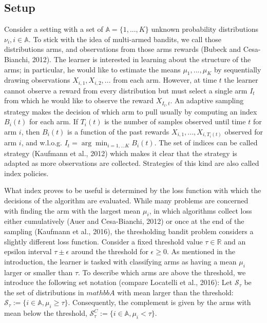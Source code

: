 \documentclass[12pt,]{article}
\begin{document}
\subsection{\texorpdfstring{Setup
\label{sec:Setup}}{Setup }}\label{setup}

Consider a setting with a set of \(\mathbb{A}=\{1, ..., K\}\) unknown
probability distributions \(\nu_i, i \in \mathbb{A}\). To stick with the
idea of multi-armed bandits, we call those distributions arms, and
observations from those arms rewards (Bubeck and Cesa-Bianchi, 2012).
The learner is interested in learning about the structure of the arms;
in particular, he would like to estimate the means \(\mu_1, ..., \mu_K\)
by sequentially drawing observations \(X_{i,1}, X_{i,2}, ...\) from each
arm. However, at time \(t\) the learner cannot observe a reward from
every distribution but must select a single arm \(I_t\) from which he
would like to observe the reward \(X_{I_t,t}\). An adaptive sampling
strategy makes the decision of which arm to pull usually by computing an
index \(B_i(t)\) for each arm. If \(T_i(t)\) is the number of samples
observed until time \(t\) for arm \(i\), then \(B_i(t)\) is a function
of the past rewards \(X_{i,1}, ..., X_{i,T_i(t)}\) observed for arm
\(i\), and w.l.o.g. \(I_t = \arg \min_{i = 1,...K} B_i(t)\). The set of
indices can be called strategy (Kaufmann et al., 2012) which makes it
clear that the strategy is adapted as more observations are collected.
Strategies of this kind are also called index policies.

What index proves to be useful is determined by the loss function with
which the decisions of the algorithm are evaluated. While many problems
are concerned with finding the arm with the largest mean \(\mu_i\), in
which algorithms collect loss either cumulatively (Auer and
Cesa-Bianchi, 2012) or once at the end of the sampling (Kaufmann et al.,
2016), the thresholding bandit problem considers a slightly different
loss function. Consider a fixed threshold value \(\tau \in \mathbb{R}\)
and an epsilon interval \(\tau \pm \epsilon\) around the threshold for
\(\epsilon \geq 0\). As mentioned in the introduction, the learner is
tasked with classifying arms as having a mean \(\mu_i\) larger or
smaller than \(\tau\). To describe which arms are above the threshold,
we introduce the following set notation (compare Locatelli et al.,
2016): Let \(\mathcal{S}_{\tau}\) be the set of distributions in
\(mathbb{A}\) with mean larger than the threshold:
\(\mathcal{S}_{\tau} := \{i \in \mathbb{A}, \mu_i \geq \tau\}\).
Consequently, the complement is given by the arms with mean below the
threshold,
\(\mathcal{S}^C_{\tau} := \{i \in \mathbb{A}, \mu_i < \tau\}\).
\end{document}
